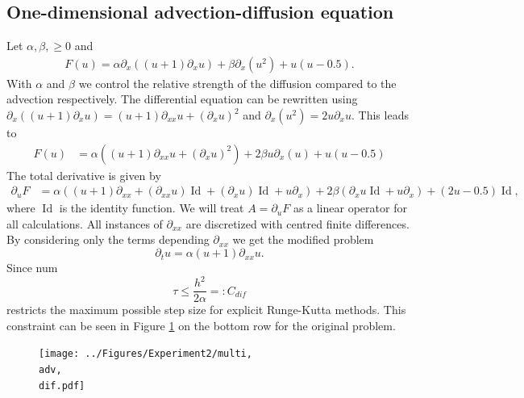 \documentclass{scrartcl}
\newcommand{\eqdefn}{=\mathrel{\mathop:}}
\begin{document}
	\subsection{One-dimensional advection-diffusion equation}
	Let $\alpha,\beta,\ge 0$ and 
	\begin{align*}
		F(u) = \alpha\partial_x((u+1)\partial_xu) + \beta\partial_x(u^2) + u(u-0.5).
	\end{align*}
	With $\alpha$ and $\beta$ we control the relative strength of the diffusion compared to the advection respectively. The differential equation can be rewritten using $\partial_x((u+1)\partial_xu) = (u+1)\partial_{xx}u + (\partial_{x}u)^2$ and $\partial_x(u^2) = 2u\partial_{x}u$.
	This leads to
	\begin{align*}
		F(u) &= 
			\alpha((u+1)\partial_{xx}u + (\partial_{x}u)^2) 
			+ 2\beta u\partial_x(u) 
			+ u(u-0.5)
	\end{align*}
	The total derivative is given by
	\begin{align*}
		\partial_{u}F &= 
			\alpha((u+1)\partial_{xx} + (\partial_{xx}u)\operatorname{Id} + (\partial_{x}u)\operatorname{Id} + u\partial_{x}) 
			+ 2\beta(\partial_xu\operatorname{Id} + u\partial_x) 
			+ (2u-0.5)\operatorname{Id}
			,
	\end{align*}
	where $\operatorname{Id}$ is the identity function. We will treat $A = \partial_{u}F$ as a linear operator for all calculations.
	All instances of $\partial_{xx}$ are discretized with centred finite differences. 
%	
	By considering only the terms depending $\partial_{xx}$ we get the modified problem
	\[
		\partial_{t}u = \alpha (u+1)\partial_{xx}u.
	\] 
	Since num
	\[
		\tau \le \frac{h^2}{2\alpha} \eqdefn C_{dif}
	\]
	restricts the maximum possible step size for explicit Runge-Kutta methods. This constraint can be seen in Figure \ref{fig:multi1DNonlinear} on the bottom row for the original problem.
	\begin{figure}[H]
		\newcommand{\adv}{\detokenize{α}=0.1}
		\newcommand{\dif}{\detokenize{β}=0.01}
		\centering
		\texttt{[image: ../Figures/Experiment2/multi, \\adv, \\dif.pdf]}
		\caption{}
		\label{fig:multi1DNonlinear}
	\end{figure}
	
\end{document}
